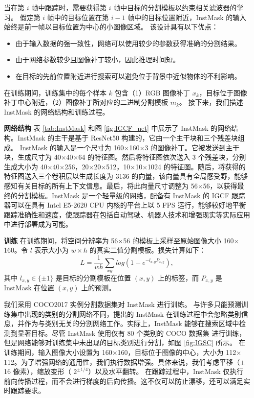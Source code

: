 当在第 $i$ 帧中跟踪时，需要获得第 $i$ 帧中目标的分割模板以约束相关滤波器的学习。
假定第 $i$ 帧中的目标位置在第 $i-1$ 帧中的目标位置附近，InstMask 的输入始终是前一帧以目标位置为中心的小图像区域。
该设计具有以下优点：

\begin{itemize}
\item 由于输入数据的强一致性，网络可以使用较少的参数获得准确的分割结果。
\item 由于网络参数较少且图像补丁较小，因此推理时间短。
\item 在目标的先前位置附近进行搜索可以避免位于背景中近似物体的不利影响。
\end{itemize}

在训练期间，训练集中的每个样本 $k$ 包含（1）RGB 图像补丁 $x_k$，目标位于图像补丁中心附近，（2）图像补丁所对应的二进制分割模板 $m_{k}$。
接下来，我们描述 InstMask 的网络结构和训练过程。

\textbf{网络结构} 表 \ref{tab:InstMask} 和图 \ref{fig:IGCF_net} 中展示了 InstMask 的网络结构。InstMask 的主干是基于 ResNet50 \cite{He2016DeepRL} 构建的，它由一个主干块和三个残差块组成。
InstMask 的输入是一个尺寸为 160$\times$160$\times$3 的图像补丁。它被发送到主干块，生成尺寸为 40$\times$40$\times$64 的特征图。然后将特征图依次送入 3 个残差块，分别生成大小为 40$\times$40$\times$256，20$\times$20$\times$512，10$\times$10$\times$1024 的特征图。随后，将获得的特征图送入三个卷积层以生成长度为 3136 的向量，该向量具有全局感受野，能够感知有关目标的所有上下文信息。最后，将此向量尺寸调整为 56$\times$56，以获得最终的分割模板。InstMask 是一个轻量级的网络，配备有 InstMask 的 IGCF 跟踪器可以在具有 Intel E5-2620 CPU 内核的平台上以 5 FPS 运行，能够较好地平衡跟踪准确性和速度，使跟踪器在包括自动驾驶、机器人技术和增强现实等实际应用中进行部署成为可能。

\textbf{训练} 在训练期间，将空间分辨率为 56$\times$56 的模板上采样至原始图像大小 160$\times$160。令 $l$ 表示大小为 $w \times h$ 的真实二值分割模板。损失计算如下：
\begin{equation}
L = \frac{1}{wh} \sum_{xy}{log(1+e^{-l_{x,y}P_{x,y}})},
\end{equation}
其中 $l_{x,y} \in \{ \pm 1 \}$ 是目标的分割模板在位置 $(x,y)$ 上的标签，而 $P_{x,y}$ 是 InstMask 在位置 $(x,y)$ 上的预测。

我们采用 COCO2017 \cite{COCO} 实例分割数据集对 InstMask 进行训练。
与许多只能预测训练集中出现的类别的分割网络不同，提出的 InstMask 在训练过程中会忽略类别信息，并作为与类别无关的分割网络工作。实际上，InstMask 能够在搜索区域中检测到显著目标。尽管 InstMask 使用仅有 80 个类别的 COCO 数据集 \cite{COCO} 进行训练，但是网络能够对训练集中未出现的目标类别进行分割，如图 \ref{fig:IGSC} 所示。
在训练期间，输入图像大小设置为 160$\times$160，目标位于图像的中心，大小为 112$\times$112。为了增强网络的通用性，我们执行数据增强。具体来说，我们考虑平移（$\pm$16 像素），缩放变形（ $2^{\pm 1/4}$）以及水平翻转。
在跟踪过程中，InstMask 仅执行前向传播过程，而不会进行梯度的后向传播。这不仅可以防止漂移，还可以满足实时跟踪要求。


